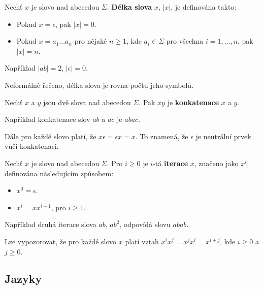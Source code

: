 \begin{definition}
    Nechť $x$ je slovo nad abecedou $\Sigma$. \textbf{Délka slova} $x$, $ |x| $, je definována takto: 
    \begin{itemize}
        \item Pokud $x=\epsilon$, pak $ |x| =0$.
        \item Pokud $x=a_1...a_n$ pro nějaké $n\ge1$, kde $a_i \in \Sigma$ pro všechna $i=1,...,n$, pak $ |x| =n$.
    \end{itemize}
\end{definition}

\begin{example}
    Například $ |ab| =2$, $ | \epsilon | =0$.
\end{example}

Neformálně řečeno, délka slova je rovna počtu jeho symbolů.

\begin{definition}
    Nechť $x$ a $y$ jsou dvě slova nad abecedou $\Sigma$. Pak $xy$ je \textbf{konkatenace} $x$ a $y$.
\end{definition}

\begin{example}
    Například konkatenace slov $ab$ a $ac$ je $abac$.
\end{example}

Dále pro každé slovo platí, že $x\epsilon=\epsilon x=x$. To znamená, že $\epsilon$ je neutrální prvek vůči konkatenaci.

\begin{definition}
    Nechť $x$ je slovo nad abecedou $\Sigma$. Pro $i\ge 0$ je $i$-tá \textbf{iterace} $x$, značeno jako $x^i$, definována následujícím způsobem:
    \begin{itemize}
        \item $x^0 = \epsilon$.
        \item $x^i = xx^{i-1}$, pro $i\ge 1$.
    \end{itemize}
\end{definition}

\begin{example}
    Například druhá iterace slova $ab$, $ab^2$, odpovídá slovu $abab$.
\end{example}

Lze vypozorovat, že pro každé slovo $x$ platí vztah $x^ix^j=x^jx^i=x^{i+j}$, kde $i\ge 0$ a $j\ge 0$.

\subsection{Jazyky}


